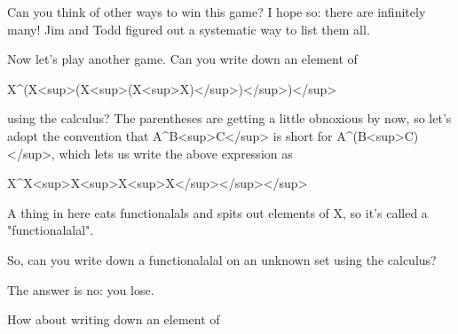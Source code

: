 Can you think of other ways to win this game?  I hope so: there are 
infinitely many!  Jim and Todd figured out a systematic way to list
them all.

Now let's play another game.  Can you write down an element of 

X^{(X<sup>(X<sup>(X<sup>X})</sup>)</sup>)</sup>

using the \lambda  calculus?  The parentheses are getting a little obnoxious
by now, so let's adopt the convention that A^{B<sup>C}</sup>
is short for A^{(B<sup>C})</sup>, which lets us write the
above expression as

X^{X<sup>X<sup>X<sup>X}</sup></sup></sup>

A thing in here eats functionalals and spits out
elements of X, so it's called a "functionalalal".  

So, can you write down a functionalalal on an unknown set using the
\lambda  calculus?

The answer is no: you lose.  

How about writing down an element of



